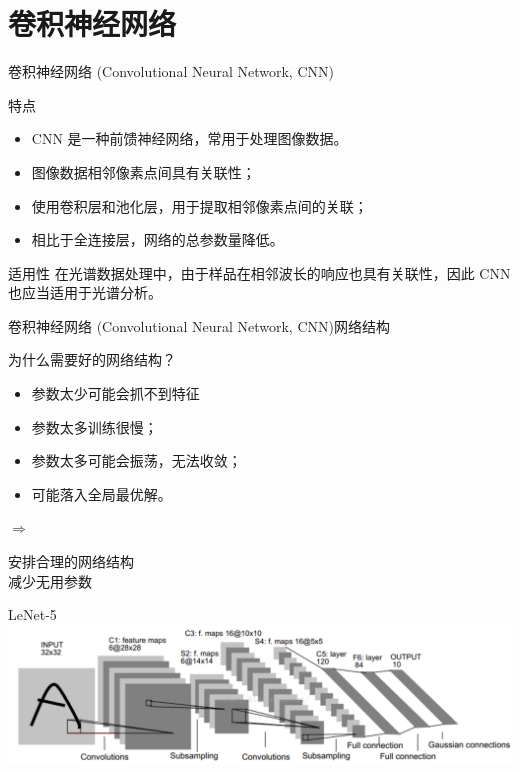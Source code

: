\documentclass[11pt]{beamer}
\begin{document}
	\section{卷积神经网络}
	\begin{frame}{卷积神经网络 (Convolutional Neural Network, CNN)}
		\begin{block}{特点}
			\begin{itemize}
				\item CNN 是一种前馈神经网络，常用于处理图像数据。
				\item 图像数据相邻像素点间具有关联性；
				\item 使用卷积层和池化层，用于提取相邻像素点间的关联；
				\item 相比于全连接层，网络的总参数量降低。
			\end{itemize}
		\end{block}
		\begin{block}{适用性}
			在光谱数据处理中，由于样品在相邻波长的响应也具有关联性，因此 CNN 也应当适用于光谱分析。
		\end{block}
	\end{frame}
	\begin{frame}{卷积神经网络 (Convolutional Neural Network, CNN)}{网络结构}
		\begin{block}{为什么需要好的网络结构？}
			\begin{minipage}{0.55\linewidth}
				\begin{itemize}
					\item 参数太少可能会抓不到特征
					\item 参数太多训练很慢；
					\item 参数太多可能会振荡，无法收敛；
					\item 可能落入全局最优解。
				\end{itemize}
			\end{minipage}
			$\Longrightarrow$ 
			\begin{minipage}{0.3\linewidth}
				安排合理的网络结构 \\ 减少无用参数
			\end{minipage}
		\end{block}
		\begin{block}{LeNet-5}
			\centering
			\includegraphics[width=0.8\linewidth]{img/LeNet-5}
		\end{block}
	\end{frame}
\end{document}
